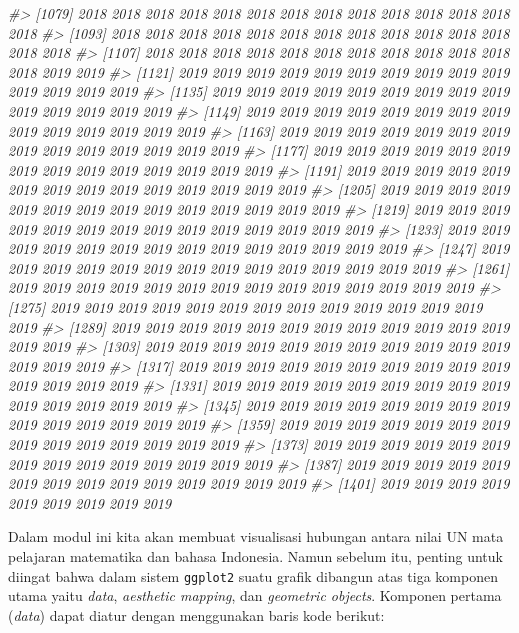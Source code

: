\documentclass[
]{article}
\newenvironment{Shaded}{\begin{snugshade}}{\end{snugshade}}
\newcommand{\CommentTok}[1]{\textcolor[rgb]{0.56,0.35,0.01}{\textit{#1}}}
\begin{document}
\begin{Shaded}
\begin{Highlighting}[]
\CommentTok{#> [1079] 2018 2018 2018 2018 2018 2018 2018 2018 2018 2018 2018 2018 2018 2018}
\CommentTok{#> [1093] 2018 2018 2018 2018 2018 2018 2018 2018 2018 2018 2018 2018 2018 2018}
\CommentTok{#> [1107] 2018 2018 2018 2018 2018 2018 2018 2018 2018 2018 2018 2018 2019 2019}
\CommentTok{#> [1121] 2019 2019 2019 2019 2019 2019 2019 2019 2019 2019 2019 2019 2019 2019}
\CommentTok{#> [1135] 2019 2019 2019 2019 2019 2019 2019 2019 2019 2019 2019 2019 2019 2019}
\CommentTok{#> [1149] 2019 2019 2019 2019 2019 2019 2019 2019 2019 2019 2019 2019 2019 2019}
\CommentTok{#> [1163] 2019 2019 2019 2019 2019 2019 2019 2019 2019 2019 2019 2019 2019 2019}
\CommentTok{#> [1177] 2019 2019 2019 2019 2019 2019 2019 2019 2019 2019 2019 2019 2019 2019}
\CommentTok{#> [1191] 2019 2019 2019 2019 2019 2019 2019 2019 2019 2019 2019 2019 2019 2019}
\CommentTok{#> [1205] 2019 2019 2019 2019 2019 2019 2019 2019 2019 2019 2019 2019 2019 2019}
\CommentTok{#> [1219] 2019 2019 2019 2019 2019 2019 2019 2019 2019 2019 2019 2019 2019 2019}
\CommentTok{#> [1233] 2019 2019 2019 2019 2019 2019 2019 2019 2019 2019 2019 2019 2019 2019}
\CommentTok{#> [1247] 2019 2019 2019 2019 2019 2019 2019 2019 2019 2019 2019 2019 2019 2019}
\CommentTok{#> [1261] 2019 2019 2019 2019 2019 2019 2019 2019 2019 2019 2019 2019 2019 2019}
\CommentTok{#> [1275] 2019 2019 2019 2019 2019 2019 2019 2019 2019 2019 2019 2019 2019 2019}
\CommentTok{#> [1289] 2019 2019 2019 2019 2019 2019 2019 2019 2019 2019 2019 2019 2019 2019}
\CommentTok{#> [1303] 2019 2019 2019 2019 2019 2019 2019 2019 2019 2019 2019 2019 2019 2019}
\CommentTok{#> [1317] 2019 2019 2019 2019 2019 2019 2019 2019 2019 2019 2019 2019 2019 2019}
\CommentTok{#> [1331] 2019 2019 2019 2019 2019 2019 2019 2019 2019 2019 2019 2019 2019 2019}
\CommentTok{#> [1345] 2019 2019 2019 2019 2019 2019 2019 2019 2019 2019 2019 2019 2019 2019}
\CommentTok{#> [1359] 2019 2019 2019 2019 2019 2019 2019 2019 2019 2019 2019 2019 2019 2019}
\CommentTok{#> [1373] 2019 2019 2019 2019 2019 2019 2019 2019 2019 2019 2019 2019 2019 2019}
\CommentTok{#> [1387] 2019 2019 2019 2019 2019 2019 2019 2019 2019 2019 2019 2019 2019 2019}
\CommentTok{#> [1401] 2019 2019 2019 2019 2019 2019 2019 2019 2019}
\end{Highlighting}
\end{Shaded}

Dalam modul ini kita akan membuat visualisasi hubungan antara nilai UN
mata pelajaran matematika dan bahasa Indonesia. Namun sebelum itu,
penting untuk diingat bahwa dalam sistem \texttt{ggplot2} suatu grafik
dibangun atas tiga komponen utama yaitu \emph{data}, \emph{aesthetic
mapping}, dan \emph{geometric objects}. Komponen pertama (\emph{data})
dapat diatur dengan menggunakan baris kode berikut:
\end{document}
